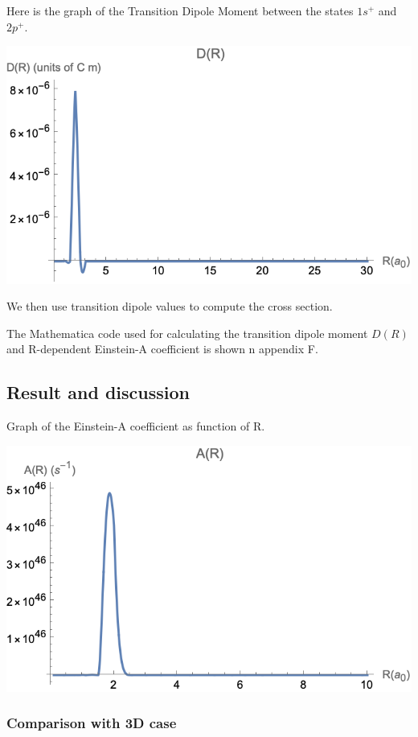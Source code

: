 Here is the graph of the Transition Dipole Moment between the states $ 1s^{+} $ and $ 2p^{+} $.

\includegraphics{DR-SI.png}

We then use transition dipole values to compute the cross section. 

The Mathematica code used for calculating the transition dipole moment  $ D(R) $ and R-dependent Einstein-A coeﬃcient is shown n appendix F.

\subsection{Result and discussion}

Graph of the Einstein-A coefficient as function of R.

\includegraphics{AR-SI.png}

\subsubsection{Comparison with 3D case}



